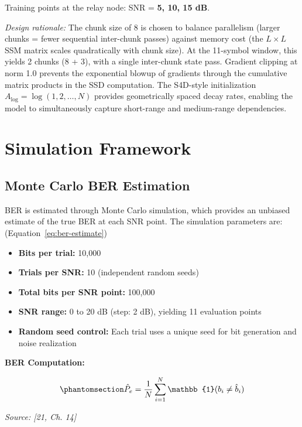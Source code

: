 \begin{itemize}
  Training points at the relay node: SNR = \textbf{5, 10, 15 dB}.

  \emph{Design rationale:} The chunk size of 8 is chosen to balance parallelism (larger chunks = fewer sequential inter-chunk passes) against memory cost (the \(L \times L\) SSM matrix scales quadratically with chunk size). At the 11-symbol window, this yields 2 chunks (8 + 3), with a single inter-chunk state pass. Gradient clipping at norm 1.0 prevents the exponential blowup of gradients through the cumulative matrix products in the SSD computation. The S4D-style initialization \(A_{\text{log}} = \log(1, 2, \dots, N)\) provides geometrically spaced decay rates, enabling the model to simultaneously capture short-range and medium-range dependencies.
\end{itemize}

\section{Simulation Framework}\label{sec:simulation-framework}

\subsection{Monte Carlo BER Estimation}\label{sec:monte-carlo-ber-estimation}

BER is estimated through Monte Carlo simulation, which provides an unbiased estimate of the true BER at each SNR point. The simulation parameters are: (Equation~\ref{eq:ber-estimate})

\begin{itemize}
\tightlist
\item
  \textbf{Bits per trial:} 10,000
\item
  \textbf{Trials per SNR:} 10 (independent random seeds)
\item
  \textbf{Total bits per SNR point:} 100,000
\item
  \textbf{SNR range:} 0 to 20 dB (step: 2 dB), yielding 11 evaluation points
\item
  \textbf{Random seed control:} Each trial uses a unique seed for bit generation and noise realization
\end{itemize}

\textbf{BER Computation:}

\begin{equation}\protect\phantomsection\label{eq:ber-estimate}{\hat{P}_e = \frac{1}{N}\sum_{i=1}^{N} \mathbb{1}(b_i \neq \hat{b}_i)
}\end{equation} \par{\small\textit{Source: [21, Ch. 14]}}

